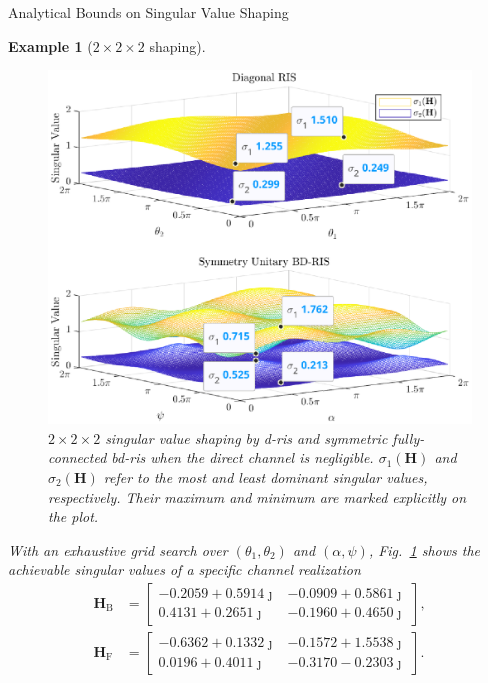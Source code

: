 \documentclass[journal]{IEEEtran}
\newtheorem{example}{Example}
\begin{document}
\begin{section}{Analytical Bounds on Singular Value Shaping}
\begin{example}[$2 \times 2 \times 2$ shaping]
\begin{figure}
			\includegraphics[width=\columnwidth]{assets/simulation/singular_trend.eps}
			\caption{$2 \times 2 \times 2$ singular value shaping by \gls{d}-\gls{ris} and symmetric fully-connected \gls{bd}-\gls{ris} when the direct channel is negligible. $\sigma_1(\mathbf{H})$ and $\sigma_2(\mathbf{H})$ refer to the most and least dominant singular values, respectively.
			Their maximum and minimum are marked explicitly on the plot.}
			\label{fg:singular_trend}
		\end{figure}
		With an exhaustive grid search over $(\theta_1, \theta_2)$ and $(\alpha, \psi)$, Fig.~\ref{fg:singular_trend} shows the achievable singular values of a specific channel realization
		\begin{equation*}
			\begin{split}
				\mathbf{H}_\mathrm{B} & =
				\begin{bmatrix}
					-0.2059 + 0.5914 \jmath & -0.0909 + 0.5861 \jmath \\
					0.4131 + 0.2651 \jmath & -0.1960 + 0.4650 \jmath
				\end{bmatrix},
				\\
				\mathbf{H}_\mathrm{F} & =
				\begin{bmatrix}
					-0.6362 + 0.1332 \jmath & -0.1572 + 1.5538 \jmath \\
					0.0196 + 0.4011 \jmath & -0.3170 - 0.2303 \jmath
				\end{bmatrix}.
			\end{split}
		\end{equation*}

\end{example}
\end{section}
\end{document}

